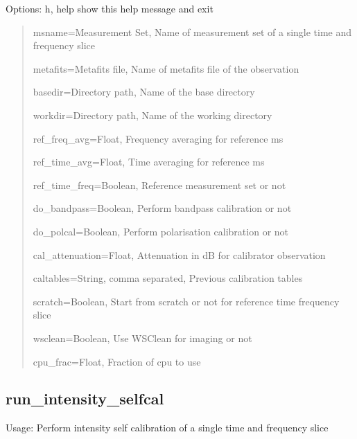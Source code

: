 \documentclass[letterpaper,10pt,english]{sphinxmanual}
\begin{document}
\sphinxAtStartPar
Options: \sphinxhyphen{}h, \sphinxhyphen{}\sphinxhyphen{}help                    show this help message and exit
\begin{quote}

\sphinxAtStartPar
\sphinxhyphen{}\sphinxhyphen{}msname=Measurement Set,      Name of measurement set of a single time and frequency slice

\sphinxAtStartPar
\sphinxhyphen{}\sphinxhyphen{}metafits=Metafits file,      Name of metafits file of the observation

\sphinxAtStartPar
\sphinxhyphen{}\sphinxhyphen{}basedir=Directory path,      Name of the base directory

\sphinxAtStartPar
\sphinxhyphen{}\sphinxhyphen{}workdir=Directory path,      Name of the working directory

\sphinxAtStartPar
\sphinxhyphen{}\sphinxhyphen{}ref\_freq\_avg=Float,          Frequency averaging for reference ms

\sphinxAtStartPar
\sphinxhyphen{}\sphinxhyphen{}ref\_time\_avg=Float,          Time averaging for reference ms

\sphinxAtStartPar
\sphinxhyphen{}\sphinxhyphen{}ref\_time\_freq=Boolean,       Reference measurement set or not

\sphinxAtStartPar
\sphinxhyphen{}\sphinxhyphen{}do\_bandpass=Boolean,         Perform bandpass calibration or not

\sphinxAtStartPar
\sphinxhyphen{}\sphinxhyphen{}do\_polcal=Boolean,           Perform polarisation calibration or not

\sphinxAtStartPar
\sphinxhyphen{}\sphinxhyphen{}cal\_attenuation=Float,       Attenuation in dB for calibrator observation

\sphinxAtStartPar
\sphinxhyphen{}\sphinxhyphen{}caltables=String, comma separated,   Previous calibration tables

\sphinxAtStartPar
\sphinxhyphen{}\sphinxhyphen{}scratch=Boolean,             Start from scratch or not for reference time frequency slice

\sphinxAtStartPar
\sphinxhyphen{}\sphinxhyphen{}wsclean=Boolean,             Use WSClean for imaging or not

\sphinxAtStartPar
\sphinxhyphen{}\sphinxhyphen{}cpu\_frac=Float,              Fraction of cpu to use
\end{quote}


\subsection{run\_intensity\_selfcal}
\label{\detokenize{scripts:run-intensity-selfcal}}
\sphinxAtStartPar
Usage:  Perform intensity self calibration of a single time and frequency slice
\end{document}
